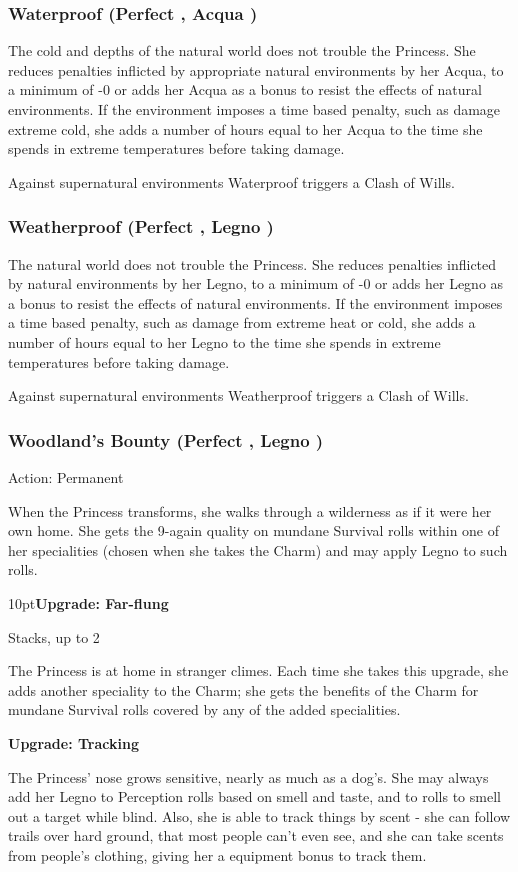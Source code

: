 \subsubsection*{Waterproof (Perfect \textbullet, Acqua \textbullet)}

The cold and depths of the natural world does not trouble the Princess. She reduces penalties inflicted by appropriate natural environments by her Acqua, to a minimum of -0 or adds her Acqua as a bonus to resist the effects of natural environments. If the environment imposes a time based penalty, such as damage extreme cold, she adds a number of hours equal to her Acqua to the time she spends in extreme temperatures before taking damage.

Against supernatural environments Waterproof triggers a Clash of Wills.

\subsubsection*{Weatherproof (Perfect \textbullet, Legno \textbullet)}

The natural world does not trouble the Princess. She reduces penalties inflicted by natural environments by her Legno, to a minimum of -0 or adds her Legno as a bonus to resist the effects of natural environments. If the environment imposes a time based penalty, such as damage from extreme heat or cold, she adds a number of hours equal to her Legno to the time she spends in extreme temperatures before taking damage.

Against supernatural environments Weatherproof triggers a Clash of Wills.

\subsubsection*{Woodland's Bounty (Perfect \textbullet, Legno \textbullet)}

\noindent Action: Permanent

When the Princess transforms, she walks through a wilderness as if it were her own home. She gets the 9-again quality on mundane Survival rolls within one of her specialities (chosen when she takes the Charm) and may apply Legno to such rolls.

\begin{myindentpar}{10pt}\textbf{Upgrade: Far-flung}

Stacks, up to 2

The Princess is at home in stranger climes. Each time she takes this upgrade, she adds another speciality to the Charm; she gets the benefits of the Charm for mundane Survival rolls covered by any of the added specialities.

\textbf{Upgrade: Tracking}

The Princess' nose grows sensitive, nearly as much as a dog's. She may always add her Legno to Perception rolls based on smell and taste, and to rolls to smell out a target while blind. Also, she is able to track things by scent - she can follow trails over hard ground, that most people can't even see, and she can take scents from people's clothing, giving her a equipment bonus to track them.\end{myindentpar}

